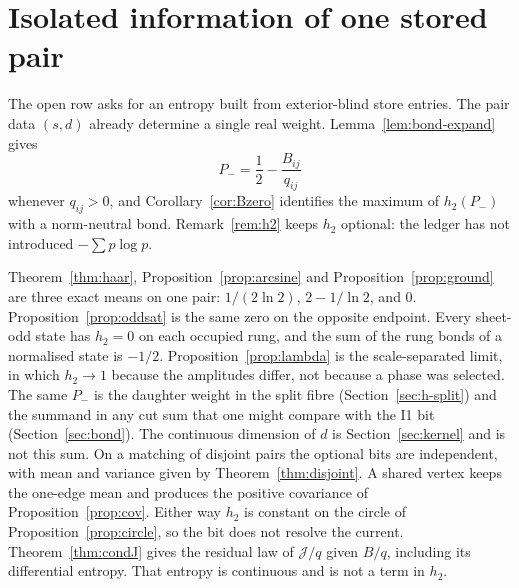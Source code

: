 \section{Isolated information of one stored pair}
\label{sec:h-store}

The open row asks for an entropy built from exterior-blind store entries.
The pair data \((s,d)\) already determine a single real weight.
Lemma~\ref{lem:bond-expand} gives
\[
P_-=\frac12-\frac{B_{ij}}{q_{ij}}
\]
whenever \(q_{ij}>0\), and Corollary~\ref{cor:Bzero} identifies the maximum of
\(h_2(P_-)\) with a norm-neutral bond.
Remark~\ref{rem:h2} keeps \(h_2\) optional: the ledger has not introduced
\(-\sum p\log p\).

Theorem~\ref{thm:haar}, Proposition~\ref{prop:arcsine} and
Proposition~\ref{prop:ground} are three exact means on one pair:
\(1/(2\ln 2)\), \(2-1/\ln 2\), and \(0\).
Proposition~\ref{prop:oddsat} is the same zero on the opposite endpoint.
Every sheet-odd state has \(h_2=0\) on each occupied rung, and the sum of
the rung bonds of a normalised state is \(-1/2\).
Proposition~\ref{prop:lambda} is the scale-separated limit, in which
\(h_2\to 1\) because the amplitudes differ, not because a phase was selected.
The same \(P_-\) is the daughter weight in the split fibre
(Section~\ref{sec:h-split}) and the summand in any cut sum that one might
compare with the I1 bit (Section~\ref{sec:bond}).
The continuous dimension of \(d\) is Section~\ref{sec:kernel} and is not this sum.
On a matching of disjoint pairs the optional bits are independent, with
mean and variance given by Theorem~\ref{thm:disjoint}.
A shared vertex keeps the one-edge mean and produces the positive
covariance of Proposition~\ref{prop:cov}.
Either way \(h_2\) is constant on the circle of
Proposition~\ref{prop:circle}, so the bit does not resolve the current.
Theorem~\ref{thm:condJ} gives the residual law of \(\mathcal{J}/q\) given
\(B/q\), including its differential entropy.
That entropy is continuous and is not a term in \(h_2\).
